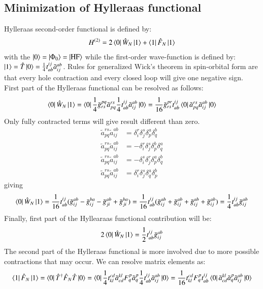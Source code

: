\documentclass[journal=jacsat]{achemso}
\numberwithin{equation}{section}
\begin{document}
\subsection{Minimization of Hylleraas functional}
Hylleraas second-order functional is defined by:
\begin{align}
H^{(2)}=2\bra{0}\hat{W}_{N}\ket{1}+\bra{1}\hat{F}_{N}\ket{1}
\end{align}
with the $\ket{0}=\ket{\Phi_{0}}=\ket{\text{HF}}$ while the first-order wave-function is defined by: $\ket{1}=\hat{T}\ket{0}=\frac{1}{4}t^{ij}_{ab}\tilde{a}^{ab}_{ij}$.
Rules for generalized Wick's theorem in spin-orbital form are that every hole contraction and every closed loop will give one negative sign. First part of the Hylleraas functional can be resolved as follows:
\begin{align}
\bra{0}\hat{W}_{N}\ket{1}=\bra{0}\frac{1}{4}\bar{g}^{pq}_{rs}\tilde{a}^{rs}_{pq}\frac{1}{4}t^{ij}_{ab}\tilde{a}^{ab}_{ij}\ket{0}=\frac{1}{16}\bar{g}^{pr}_{rs}t^{ij}_{ab}\bra{0}\tilde{a}^{rs}_{pq}\tilde{a}^{ab}_{ij}\ket{0}
\end{align}
Only fully contracted terms will give result different than zero.
\begin{align}
\tilde{a}^{rs}_{pq}\tilde{a}^{ab}_{ij}&=\delta^{r}_{i}\delta^{s}_{j}\delta^{a}_{p}\delta^{b}_{q}\\
\tilde{a}^{rs}_{pq}\tilde{a}^{ab}_{ij}&=-\delta^{r}_{i}\delta^{s}_{j}\delta^{b}_{p}\delta^{a}_{q}\\
\tilde{a}^{rs}_{pq}\tilde{a}^{ab}_{ij}&=-\delta^{s}_{i}\delta^{r}_{j}\delta^{a}_{p}\delta^{b}_{q}\\
\tilde{a}^{rs}_{pq}\tilde{a}^{ab}_{ij}&=\delta^{r}_{i}\delta^{s}_{j}\delta^{a}_{q}\delta^{b}_{p}
\end{align}
giving 
\begin{align}
\bra{0}\hat{W}_{N}\ket{1}=\frac{1}{16}t^{ij}_{ab}(\bar{g}^{ab}_{ij}-\bar{g}^{ba}_{ij}-\bar{g}^{ab}_{ji}+\bar{g}^{ba}_{ji})=\frac{1}{16}t^{ij}_{ab}(\bar{g}^{ab}_{ij}
+\bar{g}^{ab}_{ij}+\bar{g}^{ab}_{ij}+\bar{g}^{ab}_{ij})=\frac{1}{4}t^{ij}_{ab}\bar{g}^{ab}_{ij}
\end{align}
Finally, first part of the Hyllearaas functional contribution will be:
\begin{align}
2\bra{0}\hat{W}_{N}\ket{1}=\frac{1}{2}t^{ij}_{ab}\bar{g}^{ab}_{ij}
\end{align}
The second part of the Hylleraas functional is more involved due to more possible contractions that may occur. We can resolve matrix elements as:
\begin{align}
\bra{1}\hat{F}_{N}\ket{1}=\bra{0}\hat{T}^{\dagger}\hat{F}_{N}\hat{T}\ket{0}=\bra{0}\frac{1}{4}t^{cd}_{kl}\tilde{a}^{kl}_{cd}F^{p}_{q}\tilde{a}^{p}_{q}\frac{1}{4}t^{ij}_{ab}\tilde{a}^{ab}_{ij}\ket{0}=\frac{1}{16}t^{cd}_{kl}F^{p}_{q}t^{ij}_{ab}\bra{0}\tilde{a}^{kl}_{cd}\tilde{a}^{p}_{q}\tilde{a}^{ab}_{ij}\ket{0}
\end{align}
\end{document}
